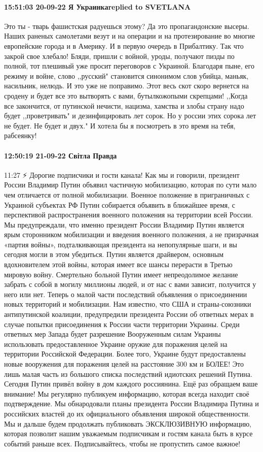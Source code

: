\paragraph{15:51:03 20-09-22 Я Украинкаreplied to SVETLANA}

Это ты - тварь фашистская радуешься этому?
Да это пропагандонские высеры. Наших раненых самолетами везут и на операции и на протезирование во многие европейские города и в Америку. И в первую очередь в Прибалтику. Так что закрой свое хлебало! Бляди, пришли с войной, уроды, получают пизды по полной, тот плешивый уже просит переговоров с Украиной.
Благодаря пыне, его режиму и войне, слово ,,русский" становится синонимом слов убийца, маньяк, насильник, нелюдь. И это уже не поправимо. Этот весь скот скоро вернется на сродену и будет все это вытворять с вами, бутылкожопыми скрепцами!
,,Когда все закончится, от путинской нечисти, нацизма, хамства и злобы страну надо будет ,,проветривать" и дезинфицировать лет сорок. Но у россии этих сорока лет не будет. Не будет и двух."
И хотела бы я посмотреть в это время на тебя, рабсеянку!

\paragraph{12:50:19 21-09-22 Світла Правда}
11:27
⚡️ Дорогие подписчики и гости канала! Как мы и говорили, президент России Владимир Путин объявил частичную мобилизацию, которая по сути мало чем отличается от полной мобилизации. Военное положение в приграничных с Украиной субъектах РФ Путин собирается объявить в ближайшее время, с перспективой распространения военного положения на территории всей России. Мы предупреждали, что именно президент России Владимир Путин является ярым сторонником мобилизации и введения военного положения, а не призрачная «партия войны», подталкивающая президента на непопулярные шаги, и вы сегодня могли в этом убедиться. Путин является драйвером, основным вдохновителем этой войны, которая имеет все шансы перерасти в Третью мировую войну. Смертельно больной Путин имеет непреодолимое желание забрать с собой в могилу миллионы людей, и от нас с вами зависит, получится у него или нет.
Теперь о малой части последствий объявления о присоединении новых территорий и мобилизации. Нам известно, что США и страны-союзники антипутинской коалиции, предупредили президента России об ответных мерах в случае попытки присоединения к России части территории Украины. Среди ответных мер Запада будет разрешение Вооруженным силам Украины использовать предоставленное Украине оружие для поражения целей на территории Российской Федерации. Более того, Украине будут предоставлены новые вооружения для поражения целей на расстояние 300 км и БОЛЕЕ! Это лишь малая часть из большого списка последствий идиотских решений Путина. Сегодня Путин привёл войну в дом каждого россиянина.
Ещё раз обращаем ваше внимание! Мы регулярно публикуем информацию, которая всегда находит своё подтверждение. Мы обнародовали планы президента России Владимира Путина и российских властей до их официального объявления широкой общественности. Мы и дальше будем продолжать публиковать ЭКСКЛЮЗИВНУЮ информацию, которая позволит нашим уважаемым подписчикам и гостям канала быть в курсе событий раньше всех. Подписывайтесь, чтобы не пропустить самое важное!

